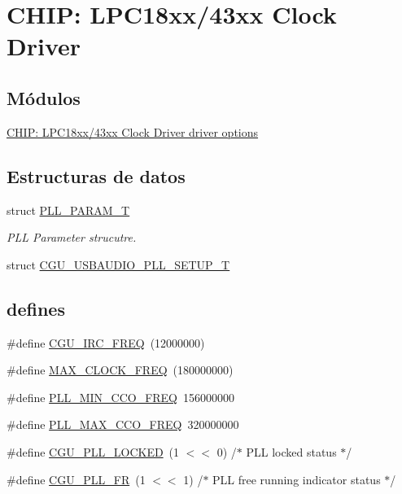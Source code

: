 \hypertarget{group___c_l_o_c_k__18_x_x__43_x_x}{}\section{C\+H\+IP\+: L\+P\+C18xx/43xx Clock Driver}
\label{group___c_l_o_c_k__18_x_x__43_x_x}
\subsection*{Módulos}
\begin{DoxyCompactItemize}
\item 
\hyperlink{group___c_l_o_c_k__18_x_x__43_x_x___o_p_t_i_o_n_s}{C\+H\+I\+P\+: L\+P\+C18xx/43xx Clock Driver driver options}
\end{DoxyCompactItemize}
\subsection*{Estructuras de datos}
\begin{DoxyCompactItemize}
\item 
struct \hyperlink{struct_p_l_l___p_a_r_a_m___t}{P\+L\+L\+\_\+\+P\+A\+R\+A\+M\+\_\+T}
\begin{DoxyCompactList}\small\item\em P\+LL Parameter strucutre. \end{DoxyCompactList}\item 
struct \hyperlink{struct_c_g_u___u_s_b_a_u_d_i_o___p_l_l___s_e_t_u_p___t}{C\+G\+U\+\_\+\+U\+S\+B\+A\+U\+D\+I\+O\+\_\+\+P\+L\+L\+\_\+\+S\+E\+T\+U\+P\+\_\+T}
\end{DoxyCompactItemize}
\subsection*{\textquotesingle{}defines\textquotesingle{}}
\begin{DoxyCompactItemize}
\item 
\#define \hyperlink{group___c_l_o_c_k__18_x_x__43_x_x_gaec3e2b28e900580cc4dc72034f7371fd}{C\+G\+U\+\_\+\+I\+R\+C\+\_\+\+F\+R\+EQ}~(12000000)
\item 
\#define \hyperlink{group___c_l_o_c_k__18_x_x__43_x_x_gae14be49570b87fcba70e698abd87549e}{M\+A\+X\+\_\+\+C\+L\+O\+C\+K\+\_\+\+F\+R\+EQ}~(180000000)
\item 
\#define \hyperlink{group___c_l_o_c_k__18_x_x__43_x_x_ga1b275f6e0df5d06ec980f9da9e3a1f02}{P\+L\+L\+\_\+\+M\+I\+N\+\_\+\+C\+C\+O\+\_\+\+F\+R\+EQ}~156000000
\item 
\#define \hyperlink{group___c_l_o_c_k__18_x_x__43_x_x_ga30bea6f91385c809e9b69f60bb76e463}{P\+L\+L\+\_\+\+M\+A\+X\+\_\+\+C\+C\+O\+\_\+\+F\+R\+EQ}~320000000
\item 
\#define \hyperlink{group___c_l_o_c_k__18_x_x__43_x_x_ga8d7042242ace9a2ae21d16181ce51a2d}{C\+G\+U\+\_\+\+P\+L\+L\+\_\+\+L\+O\+C\+K\+ED}~(1 $<$$<$ 0)	/$\ast$ P\+LL locked status $\ast$/
\item 
\#define \hyperlink{group___c_l_o_c_k__18_x_x__43_x_x_gafa8279d333ad3959b13d9ad5c57787df}{C\+G\+U\+\_\+\+P\+L\+L\+\_\+\+FR}~(1 $<$$<$ 1)	/$\ast$ P\+LL free running indicator status $\ast$/
\end{DoxyCompactItemize}
